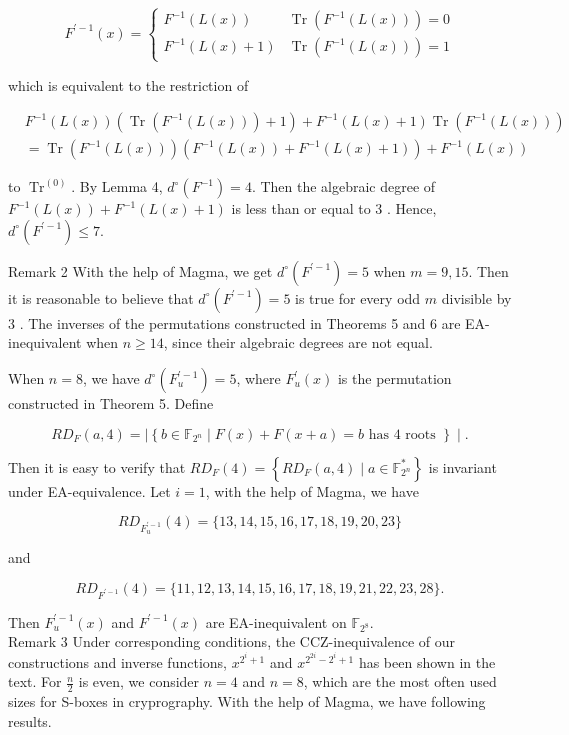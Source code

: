 \documentclass[10pt]{article}
\begin{document}
$$
F^{\prime-1}(x)= \begin{cases}F^{-1}(L(x)) & \operatorname{Tr}\left(F^{-1}(L(x))\right)=0 \\ F^{-1}(L(x)+1) & \operatorname{Tr}\left(F^{-1}(L(x))\right)=1\end{cases}
$$

which is equivalent to the restriction of

$$
\begin{aligned}
& F^{-1}(L(x))\left(\operatorname{Tr}\left(F^{-1}(L(x))\right)+1\right)+F^{-1}(L(x)+1) \operatorname{Tr}\left(F^{-1}(L(x))\right) \\
& =\operatorname{Tr}\left(F^{-1}(L(x))\right)\left(F^{-1}(L(x))+F^{-1}(L(x)+1)\right)+F^{-1}(L(x))
\end{aligned}
$$

to $\operatorname{Tr}^{(0)}$. By Lemma 4, $d^{\circ}\left(F^{-1}\right)=4$. Then the algebraic degree of $F^{-1}(L(x))+F^{-1} (L(x)+1)$ is less than or equal to 3 . Hence, $d^{\circ}\left(F^{\prime-1}\right) \leq 7$.

Remark 2 With the help of Magma, we get $d^{\circ}\left(F^{\prime-1}\right)=5$ when $m=9,15$. Then it is reasonable to believe that $d^{\circ}\left(F^{\prime-1}\right)=5$ is true for every odd $m$ divisible by 3 . The inverses of the permutations constructed in Theorems 5 and 6 are EA-inequivalent when $n \geq 14$, since their algebraic degrees are not equal.

When $n=8$, we have $d^{\circ}\left(F_{u}^{\prime-1}\right)=5$, where $F_{u}^{\prime}(x)$ is the permutation constructed in Theorem 5. Define

$$
R D_{F}(a, 4)=\mid\left\{b \in \mathbb{F}_{2^{n}} \mid F(x)+F(x+a)=b \text { has } 4 \text { roots }\right\} \mid .
$$

Then it is easy to verify that $R D_{F}(4)=\left\{R D_{F}(a, 4) \mid a \in \mathbb{F}_{2^{n}}^{*}\right\}$ is invariant under EA-equivalence. Let $i=1$, with the help of Magma, we have

$$
R D_{F_{u}^{\prime-1}}(4)=\{13,14,15,16,17,18,19,20,23\}
$$

and

$$
R D_{F^{\prime-1}}(4)=\{11,12,13,14,15,16,17,18,19,21,22,23,28\} .
$$

Then $F_{u}^{\prime-1}(x)$ and $F^{\prime-1}(x)$ are EA-inequivalent on $\mathbb{F}_{2^{8}}$.\\
Remark 3 Under corresponding conditions, the CCZ-inequivalence of our constructions and inverse functions, $x^{2^{i}+1}$ and $x^{2^{2 i}-2^{i}+1}$ has been shown in the text. For $\frac{n}{2}$ is even, we consider $n=4$ and $n=8$, which are the most often used sizes for S-boxes in cryprography. With the help of Magma, we have following results.
\end{document}
